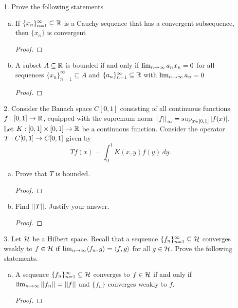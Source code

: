 \begin{itemize}

\item[1.] Prove the following statements
\begin{enumerate}[(a)]
    \item If $\{x_n\}_{n=1}^{\infty} \subseteq \mathbb{R}$ is a Cauchy sequence that has a convergent subsequence, then $\{x_n\}$ is convergent
    \begin{proof}

    \end{proof}

    \item A subset $A \subseteq \mathbb{R}$ is bounded if and only if $\lim_{n \rightarrow \infty} a_n x_n = 0$ for all sequences $\{x_n\}_{n=1}^{\infty} \subseteq A$ and $\{a_n\}_{n=1}^{\infty} \subseteq \mathbb{R}$ with $\lim_{n \rightarrow \infty} a_n = 0$
    \begin{proof}

    \end{proof}
\end{enumerate}





\item[2.] Consider the Banach space $C[0, 1]$ consisting of all continuous functions $f :
[0, 1] \rightarrow \mathbb{R}$, equipped with the supremum norm $\left|\left|{}f\right|\right|_{\infty} = \sup_{x \in [0,1]} |f(x)|$. Let $K : [0, 1] \times [0, 1] \rightarrow \mathbb{R}$ be a continuous function. Consider the operator $T : C[0, 1] \rightarrow C[0, 1]$ given by
$$Tf(x) = \int_0^1 K(x,y)f(y) \ dy.$$
\begin{enumerate}[(a)]
    \item Prove that $T$ is bounded.
    \begin{proof}

    \end{proof}

    \item Find $\left|\left|{}T\right|\right|$. Justify your answer.
    \begin{proof}

    \end{proof}
\end{enumerate}






\item[3.] Let $\mathcal{H}$ be a Hilbert space. Recall that a sequence $\{f_n\}_{n=1}^{\infty} \subseteq \mathcal{H}$ converges weakly to $f \in \mathcal{H}$ if $\lim_{n \rightarrow \infty} \langle{}f_n,g\rangle = \langle{}f,g\rangle$ for all $g \in \mathcal{H}$. Prove the following statements.
\begin{enumerate}[(a)]
    \item A sequence $\{f_n\}_{n=1}^{\infty} \subseteq \mathcal{H}$  converges to $f \in \mathcal{H}$ if and only if $\lim_{n \rightarrow \infty} \left|\left|{}f_n\right|\right| = \left|\left|{}f\right|\right|$
and $\{f_n\}$ converges weakly to $f$.
    \begin{proof}


\end{proof}
\end{enumerate}
\end{itemize}
